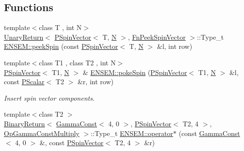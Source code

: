 \subsection*{Functions}
\begin{DoxyCompactItemize}
\item 
{\footnotesize template$<$class T , int N$>$ }\\\mbox{\hyperlink{structENSEM_1_1UnaryReturn}{Unary\+Return}}$<$ \mbox{\hyperlink{classENSEM_1_1PSpinVector}{P\+Spin\+Vector}}$<$ T, \mbox{\hyperlink{adat__devel_2lib_2hadron_2operator__name__util_8cc_a7722c8ecbb62d99aee7ce68b1752f337}{N}} $>$, \mbox{\hyperlink{structENSEM_1_1FnPeekSpinVector}{Fn\+Peek\+Spin\+Vector}} $>$\+::Type\+\_\+t \mbox{\hyperlink{group__primspinvector_gad13d4acbc90e4d69a8528585ad1c35c8}{E\+N\+S\+E\+M\+::peek\+Spin}} (const \mbox{\hyperlink{classENSEM_1_1PSpinVector}{P\+Spin\+Vector}}$<$ T, \mbox{\hyperlink{adat__devel_2lib_2hadron_2operator__name__util_8cc_a7722c8ecbb62d99aee7ce68b1752f337}{N}} $>$ \&l, int row)
\item 
{\footnotesize template$<$class T1 , class T2 , int N$>$ }\\\mbox{\hyperlink{classENSEM_1_1PSpinVector}{P\+Spin\+Vector}}$<$ T1, \mbox{\hyperlink{adat__devel_2lib_2hadron_2operator__name__util_8cc_a7722c8ecbb62d99aee7ce68b1752f337}{N}} $>$ \& \mbox{\hyperlink{group__primspinvector_ga55ef7594c5803a6f510d30a63e5aab4b}{E\+N\+S\+E\+M\+::poke\+Spin}} (\mbox{\hyperlink{classENSEM_1_1PSpinVector}{P\+Spin\+Vector}}$<$ T1, \mbox{\hyperlink{adat__devel_2lib_2hadron_2operator__name__util_8cc_a7722c8ecbb62d99aee7ce68b1752f337}{N}} $>$ \&l, const \mbox{\hyperlink{classENSEM_1_1PScalar}{P\+Scalar}}$<$ T2 $>$ \&r, int row)
\begin{DoxyCompactList}\small\item\em Insert spin vector components. \end{DoxyCompactList}\item 
{\footnotesize template$<$class T2 $>$ }\\\mbox{\hyperlink{structENSEM_1_1BinaryReturn}{Binary\+Return}}$<$ \mbox{\hyperlink{classENSEM_1_1GammaConst}{Gamma\+Const}}$<$ 4, 0 $>$, \mbox{\hyperlink{classENSEM_1_1PSpinVector}{P\+Spin\+Vector}}$<$ T2, 4 $>$, \mbox{\hyperlink{structENSEM_1_1OpGammaConstMultiply}{Op\+Gamma\+Const\+Multiply}} $>$\+::Type\+\_\+t \mbox{\hyperlink{group__primspinvector_ga78eeeb22b735ad934f6d55320f04be68}{E\+N\+S\+E\+M\+::operator$\ast$}} (const \mbox{\hyperlink{classENSEM_1_1GammaConst}{Gamma\+Const}}$<$ 4, 0 $>$ \&, const \mbox{\hyperlink{classENSEM_1_1PSpinVector}{P\+Spin\+Vector}}$<$ T2, 4 $>$ \&r)

\end{DoxyCompactItemize}
